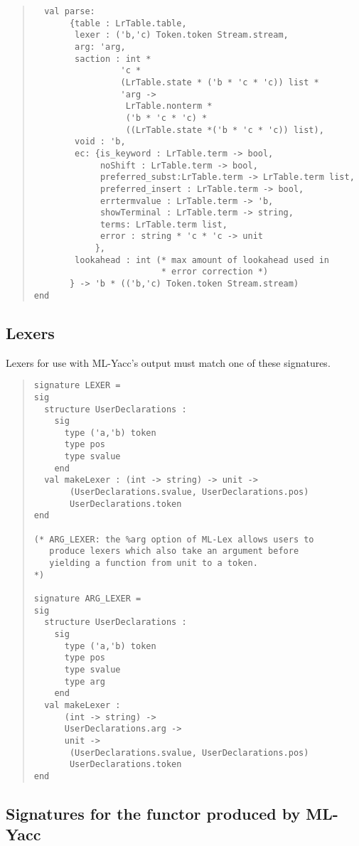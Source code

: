 \begin{quote}
\begin{verbatim}
  val parse:
       {table : LrTable.table,
        lexer : ('b,'c) Token.token Stream.stream,
        arg: 'arg,
        saction : int *
                 'c *
                 (LrTable.state * ('b * 'c * 'c)) list * 
                 'arg ->
                  LrTable.nonterm *
                  ('b * 'c * 'c) *
                  ((LrTable.state *('b * 'c * 'c)) list),
        void : 'b,
        ec: {is_keyword : LrTable.term -> bool,
             noShift : LrTable.term -> bool,
             preferred_subst:LrTable.term -> LrTable.term list,
             preferred_insert : LrTable.term -> bool,
             errtermvalue : LrTable.term -> 'b,
             showTerminal : LrTable.term -> string,
             terms: LrTable.term list,
             error : string * 'c * 'c -> unit
            },
        lookahead : int (* max amount of lookahead used in
                         * error correction *)
       } -> 'b * (('b,'c) Token.token Stream.stream)
end
\end{verbatim}
\end{quote}

\subsection{Lexers}

Lexers for use with ML-Yacc's output must match one of these signatures.

\begin{quote}
\begin{verbatim}
signature LEXER =
sig
  structure UserDeclarations :
    sig
      type ('a,'b) token
      type pos
      type svalue
    end
  val makeLexer : (int -> string) -> unit -> 
       (UserDeclarations.svalue, UserDeclarations.pos)
       UserDeclarations.token
end

(* ARG_LEXER: the %arg option of ML-Lex allows users to
   produce lexers which also take an argument before
   yielding a function from unit to a token.
*)

signature ARG_LEXER =
sig
  structure UserDeclarations :
    sig
      type ('a,'b) token
      type pos
      type svalue
      type arg
    end
  val makeLexer :
      (int -> string) ->
      UserDeclarations.arg ->
      unit -> 
       (UserDeclarations.svalue, UserDeclarations.pos)
       UserDeclarations.token
end
\end{verbatim}
\end{quote}

\subsection{Signatures for the functor produced by ML-Yacc}

